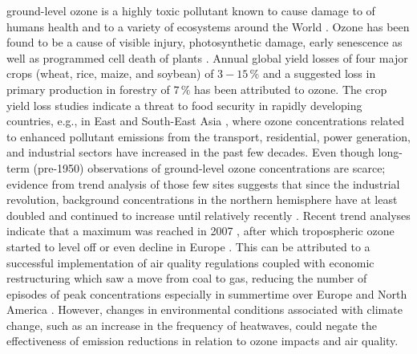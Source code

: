 \documentclass[bg, manuscript]{copernicus}
\begin{document}


\introduction  %
\label{sec:intro}

ground-level ozone is a highly toxic pollutant known to cause damage to of humans health \citep{WHO2008} and to a variety of ecosystems around the World \citep{PT:Emberson2020}. Ozone has been found to be a cause of visible injury, photosynthetic damage, early senescence as well as programmed cell death of plants \citep{PCE:Kangasjarvi2005}. Annual global yield losses of four major crops (wheat, rice, maize, and soybean) of $3-15\,\unit{\%}$ \citep{PJ:Ainsworth2017} and a suggested loss in primary production in forestry of $7\,\unit{\%}$ \citep{GCB:Wittig2009,EP:Matyssek2012} has been attributed to ozone.
The crop yield loss studies indicate a threat to food security in rapidly developing countries, e.g., in East and South-East Asia \citep{GCB:Tang2013,NCC:Tai2014,AE:Chuwah2015,GCB:Mills2018}, where ozone concentrations related to enhanced pollutant emissions from the transport, residential, power generation, and industrial sectors have increased in the past few decades. Even though long-term (pre-1950) observations of ground-level ozone concentrations are scarce; evidence from trend analysis of those few sites suggests that since the industrial revolution, background concentrations in the northern hemisphere have at least doubled and continued to increase until relatively recently \citep[Chapter 2]{IPCC2013}. Recent trend analyses indicate that a maximum was reached in 2007 \citep{AE:Derwent2018}, after which tropospheric ozone started to level off or even decline in Europe \citep{ESA:Cooper2014, ACP:Wespes2018,ESA:Gaudel2018}. This can be attributed to a successful implementation of air quality regulations coupled with economic restructuring which saw a move from coal to gas, reducing the number of episodes of peak concentrations especially in summertime over Europe and North America \citep[e.g.,][]{ESA:Fleming2018, ESA:Mills2018}. However, changes in environmental conditions associated with climate change, such as an increase in the frequency of heatwaves, could negate the effectiveness of emission reductions in relation to ozone impacts and air quality\citep{NCC:Lin2020}.
\end{document}

